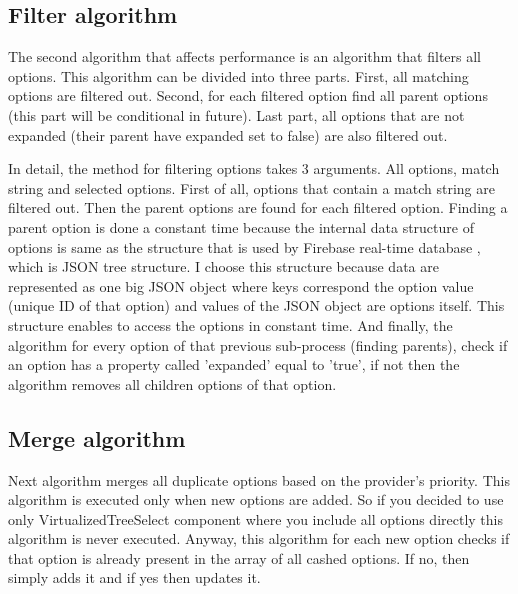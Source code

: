 \subsection{Filter algorithm}

The second algorithm that affects performance is an algorithm that filters all options. This algorithm can be divided into three parts. First, all matching options are filtered out. Second, for each filtered option find all parent options (this part will be conditional in future). Last part, all options that are not expanded (their parent have expanded set to false) are also filtered out. 

In detail, the method for filtering options takes 3 arguments. All options, match string and selected options. First of all, options that contain a match string are filtered out. Then the parent options are found for each filtered option. Finding a parent option is done a constant time because the internal data structure of options is same as the structure that is used by Firebase real-time database \parencite{firebase}, which is JSON tree structure. I choose this structure because data are represented as one big JSON object where keys correspond the option value (unique ID of that option) and values of the JSON object are options itself. This structure enables to access the options in constant time. And finally, the algorithm for every option of that previous sub-process (finding parents),  check if an option has a property called 'expanded' equal to 'true', if not then the algorithm removes all children options of that option.

\subsection{Merge algorithm}

Next algorithm merges all duplicate options based on the provider's priority. This algorithm is executed only when new options are added. So if you decided to use only VirtualizedTreeSelect component where you include all options directly this algorithm is never executed. Anyway, this algorithm for each new option checks if that option is already present in the array of all cashed options. If no, then simply adds it and if yes then updates it.

